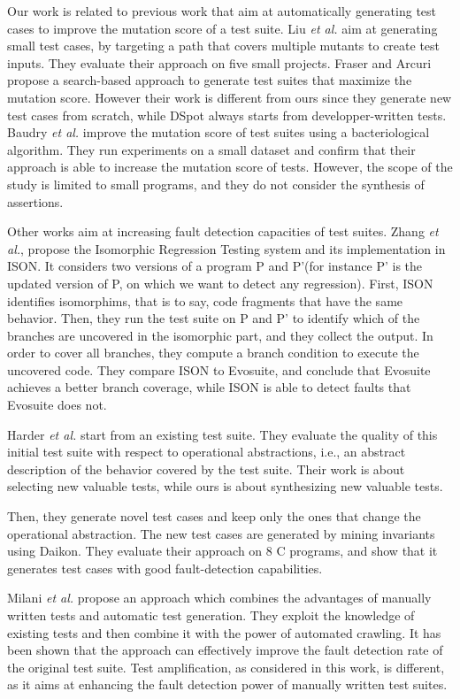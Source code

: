 \documentclass[table,xcdraw,smallextended]{svjour3}
\newcommand{\etal}{\textit{et al.}\xspace}
\newcommand{\dspot}{DSpot\xspace}
\begin{document}
Our work is related to previous work that aim at automatically generating test cases to improve the mutation score of a test suite.
Liu \etal \cite{multiple-mutants} aim at generating small test cases, by targeting a path that covers multiple mutants to create test inputs. They evaluate their approach on five small projects. Fraser and Arcuri \cite{evosuite:emse14_mutation} propose a search-based approach to generate test suites that maximize the mutation score. However their work is different from ours since they generate new test cases from scratch, while \dspot always starts from developper-written tests. 
Baudry \etal \cite{Baudry05a} improve the mutation score of test suites using a bacteriological algorithm. They run experiments on a small dataset and confirm that their approach is able to increase the mutation score of tests. However, the scope of the study is limited to small programs, and they do not consider the synthesis of assertions.

Other works aim at increasing fault detection capacities of test suites.
Zhang \etal \cite{Zhang:2016:IRT:2950290.2950313}, propose the Isomorphic Regression Testing system and its implementation in ISON. It considers two versions of a program P and P'(for instance P' is the updated version of P, on which we want to detect any regression). First, ISON identifies isomorphims, that is to say, code fragments that have the same behavior. Then, they run the test suite on P and P' to identify which of the branches are uncovered in the isomorphic part, and they  collect the output. In order to cover all branches, they compute a branch condition to execute the uncovered code. They compare ISON to Evosuite,  and conclude that Evosuite achieves a better branch coverage, while ISON is able to detect faults that Evosuite does not.

Harder \etal \cite{Harder03} start from an existing test suite. They evaluate the quality of this initial test suite with respect to operational abstractions, i.e., an abstract description of the behavior covered by the test suite. Their work is about selecting new valuable tests, while ours is about synthesizing new valuable tests.

Then, they generate novel test cases and keep only the ones that change the operational abstraction.
The new test cases are generated by mining invariants using Daikon.  They evaluate their approach on 8 C programs, and show that it generates test cases with good fault-detection capabilities.


Milani \etal \cite{milani2014} propose an approach which combines the advantages of manually written tests and automatic test generation. They exploit the knowledge of existing tests and then combine it with the power of automated crawling. It has been shown that the approach can effectively improve the fault detection rate of the original test suite.
Test amplification, as considered in this work, is different, as it aims at enhancing the fault detection power of manually written test suites.
\end{document}
